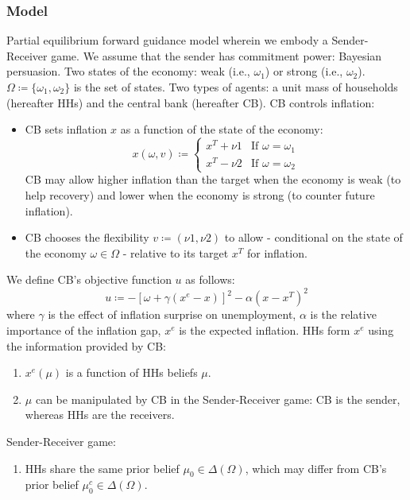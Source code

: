 \documentclass{beamer}
\begin{document}
\begin{frame}[allowframebreaks]
\frametitle{Model}
Partial equilibrium forward guidance model wherein we embody a Sender-Receiver game. 
\vskip10pt
We assume that the sender has commitment power: Bayesian persuasion. 
\vskip10pt
Two states of the economy: weak (i.e., $\omega_1$) or strong (i.e., $\omega_2$). $\Omega \coloneqq \{\omega_1, \omega_2\}$ is the set of states.
\vskip10pt
Two types of agents: a unit mass of households (hereafter HHs) and the central bank (hereafter CB). 
\vskip10pt 
\framebreak
CB controls inflation:
\vskip10pt
\begin{itemize}
    \item CB sets inflation $x$ as a function of the state of the economy: 
    \begin{equation*}
        x(\omega,v)\coloneqq\left\{
        \begin{array}{cc}
        x^T+\nu1&  \mbox{If } \omega=\omega_1\\
        x^T-\nu2   &  \mbox{If } \omega=\omega_2
        \end{array}
        \right.
    \end{equation*}
    CB may allow higher inflation than the target when the economy is weak (to help recovery) and lower when the economy is strong (to counter future inflation).
    \vskip10pt
    \item CB chooses the flexibility $v\coloneqq(\nu1,\nu2)$ to allow - conditional on the state of the economy $\omega\in \Omega$ - relative to its target $x^T$ for inflation.
\end{itemize} We define CB's objective function $u$ as follows:
\begin{equation}
    \label{uc}
    u \coloneqq -\left[\omega+\gamma(x^e-x)\right]^2-\alpha(x-x^T)^2
\end{equation}
where $\gamma$ is the effect of inflation surprise on unemployment, $\alpha$ is the relative importance of the inflation gap, $x^e$ is the expected inflation.
\vskip10pt
HHs form $x^e$ using the information provided by CB:
\begin{enumerate}
    \item $x^e(\mu)$ is a function of HHs beliefs $\mu$.
    \item $\mu$ can be manipulated by CB in the Sender-Receiver game: CB is the sender, whereas HHs are the receivers.
\end{enumerate}
\vskip10pt
\framebreak
Sender-Receiver game: 
\begin{enumerate}
    \item HHs share the same prior belief $\mu_0 \in \Delta(\Omega)$, which may differ from CB's prior belief $\mu_0^c \in \Delta(\Omega)$.

\end{enumerate}
\end{frame}
\end{document}
